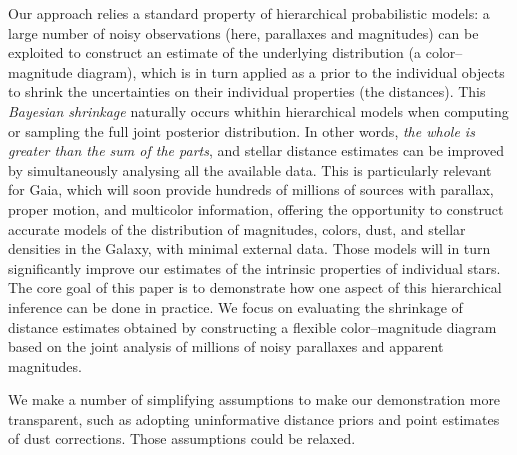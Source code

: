 \documentclass[manuscript, letterpaper]{aastex6}
\begin{document}
Our approach relies a standard property of hierarchical probabilistic models: a large number of noisy observations (here, parallaxes and magnitudes) can be exploited to construct an estimate of the underlying distribution (a color--magnitude diagram), which is in turn applied as a prior to the individual objects to shrink the uncertainties on their individual properties (the distances).
This \textit{Bayesian shrinkage} naturally occurs whithin hierarchical models when computing or sampling the full joint posterior distribution. 
In other words, \textit{the whole is greater than the sum of the parts}, and stellar distance estimates can be improved by simultaneously analysing all the available data.
This is particularly relevant for Gaia, which will soon provide hundreds of millions of sources with parallax, proper motion, and multicolor information, offering the opportunity to construct accurate models of the distribution of magnitudes, colors, dust, and stellar densities in the Galaxy, with minimal external data. 
Those models will in turn significantly improve our estimates of the intrinsic properties of individual stars.
The core goal of this paper is to demonstrate how one aspect of this hierarchical inference can be done in practice. 
We focus on evaluating the shrinkage of distance estimates obtained by constructing a flexible color--magnitude diagram based on the joint analysis of millions of noisy parallaxes and apparent magnitudes.

We make a number of simplifying assumptions to make our demonstration more transparent, such as adopting uninformative distance priors and point estimates of dust corrections. 
Those assumptions could be relaxed. 
\end{document}
